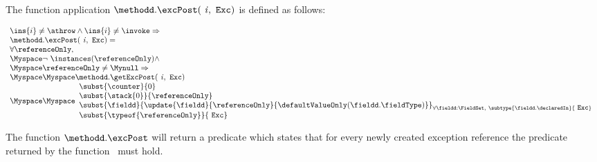 The function application $\methodd.\excPost( \mbox{ \rm \textit{i}} ,  \mbox{ \rm \texttt{Exc}} )   $ is defined as follows:
\begin{defExcRuntime}   \label{wp:exc:defExcRuntime}
      $$ \begin{array}{l}
            \ins{i} \neq \athrow \wedge \ins{i} \neq \invoke \Rightarrow  \\
           \methodd.\excPost( \mbox{ \rm \textit{i}} ,  \mbox{ \rm \texttt{Exc}}) = \\
                     \forall \referenceOnly,\\
                      \Myspace    \neg \ \instances(\referenceOnly) \wedge \\
		      \Myspace \referenceOnly \neq \Mynull \Rightarrow	\\

       \Myspace    \Myspace    \methodd.\getExcPost(\mbox{ \rm \textit{i}},  \mbox{ \rm \texttt{Exc}})\\
         \Myspace    \Myspace                \begin{array}{l}
                        \subst{\counter}{0} \\
			\subst{\stack{0}}{\referenceOnly} \\
                         \subst{ \fieldd} { \update{\fieldd} { \referenceOnly }{\defaultValueOnly( \fieldd.  \fieldType ) } }_{{\small \forall \fieldd : \FieldSet, \ 
                         \subtype{\fieldd.\declaredIn}{ \mbox{ \rm \texttt{Exc}}} } } \\
			  \subst{ \typeof{\referenceOnly}}{  \mbox{ \rm \texttt{Exc}} } \\
                       \end{array} 
        \end{array}$$   

\end{defExcRuntime} 
   


 




The function $\methodd.\excPost$ will return a predicate which states that for every newly created exception reference  
the predicate returned by the function \getExcPost \ must hold.


 
